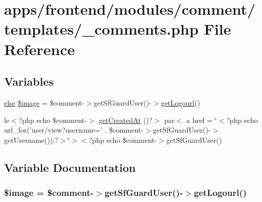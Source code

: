 \hypertarget{frontend_2modules_2comment_2templates_2__comments_8php}{\section{apps/frontend/modules/comment/templates/\-\_\-comments.php File Reference}
\label{frontend_2modules_2comment_2templates_2__comments_8php}
}
\subsection*{Variables}
\begin{DoxyCompactItemize}
\item 
\hyperlink{live_2modules_2team_2templates_2management_success_8php_a0544c3fe466e421738dae463968b70ba}{else} \hyperlink{frontend_2modules_2comment_2templates_2__comments_8php_ad6ae3032a6e108277018579e7b89376d}{\$image} = \$comment-\/$>$get\-Sf\-Guard\-User()-\/$>$\hyperlink{backend_2modules_2tournament_2templates_2index_success_8php_a35941bec2f3cf7beef9b8010a1342325}{get\-Logourl}()
\item 
le$<$?php echo \$comment-\/$>$ \hyperlink{frontend_2modules_2comment_2templates_2__comments_8php_a4dd7f607c7b5683f1ebb8f4b4260ec6d}{get\-Created\-At} ()?$>$ par$<$ a href = \char`\"{}$<$?php echo url\-\_\-for('user/view?username=' . \$comment-\/$>$get\-Sf\-Guard\-User()-\/$>$get\-Username());?$>$\char`\"{}$>$$<$?php echo \$comment-\/$>$get\-Sf\-Guard\-User()
\end{DoxyCompactItemize}


\subsection{Variable Documentation}
\hypertarget{frontend_2modules_2comment_2templates_2__comments_8php_ad6ae3032a6e108277018579e7b89376d}{
\subsubsection[{\$image}]{ \$image = \$comment-\/$>$get\-Sf\-Guard\-User()-\/$>${\bf get\-Logourl}()}}\label{frontend_2modules_2comment_2templates_2__comments_8php_ad6ae3032a6e108277018579e7b89376d}


